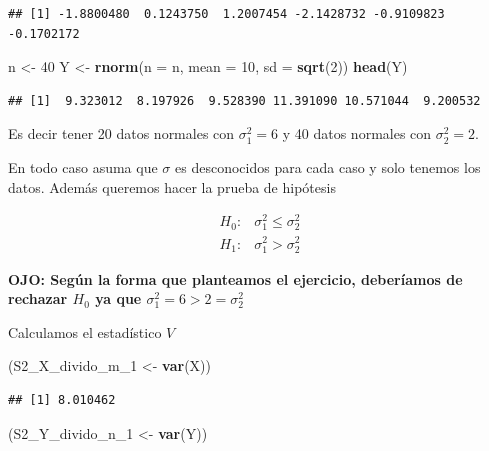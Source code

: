 \documentclass[
  12pt,
]{book}
\newenvironment{Shaded}{\begin{snugshade}}{\end{snugshade}}
\newcommand{\DataTypeTok}[1]{\textcolor[rgb]{0.13,0.29,0.53}{#1}}
\newcommand{\DecValTok}[1]{\textcolor[rgb]{0.00,0.00,0.81}{#1}}
\newcommand{\KeywordTok}[1]{\textcolor[rgb]{0.13,0.29,0.53}{\textbf{#1}}}
\newcommand{\NormalTok}[1]{#1}
\newcommand{\StringTok}[1]{\textcolor[rgb]{0.31,0.60,0.02}{#1}}
\begin{document}
\begin{verbatim}
## [1] -1.8800480  0.1243750  1.2007454 -2.1428732 -0.9109823 -0.1702172
\end{verbatim}

\begin{Shaded}
\begin{Highlighting}[]
\NormalTok{n \textless{}{-}}\StringTok{ }\DecValTok{40}
\NormalTok{Y \textless{}{-}}\StringTok{ }\KeywordTok{rnorm}\NormalTok{(}\DataTypeTok{n =}\NormalTok{ n, }\DataTypeTok{mean =} \DecValTok{10}\NormalTok{, }\DataTypeTok{sd =} \KeywordTok{sqrt}\NormalTok{(}\DecValTok{2}\NormalTok{))}
\KeywordTok{head}\NormalTok{(Y)}
\end{Highlighting}
\end{Shaded}

\begin{verbatim}
## [1]  9.323012  8.197926  9.528390 11.391090 10.571044  9.200532
\end{verbatim}

Es decir tener 20 datos normales con \(\sigma_1^2 = 6\) y 40 datos normales con \(\sigma_2^2 = 2\).

En todo caso asuma que \(\sigma\) es desconocidos para cada caso y solo tenemos
los datos. Además queremos hacer la prueba de hipótesis

\[
\begin{array}{ll}
H_{0}: & \sigma_{1}^{2} \leq \sigma_{2}^{2} \\
H_{1}: & \sigma_{1}^{2}>\sigma_{2}^{2}
\end{array}
\]

\textbf{OJO: Según la forma que planteamos el ejercicio, deberíamos de rechazar \(H_0\) ya que \(\sigma_1^2 = 6 > 2 = \sigma_2^2\)}

Calculamos el estadístico \(V\)

\begin{Shaded}
\begin{Highlighting}[]
\NormalTok{(S2\_X\_divido\_m\_}\DecValTok{1}\NormalTok{ \textless{}{-}}\StringTok{ }\KeywordTok{var}\NormalTok{(X))}
\end{Highlighting}
\end{Shaded}

\begin{verbatim}
## [1] 8.010462
\end{verbatim}

\begin{Shaded}
\begin{Highlighting}[]
\NormalTok{(S2\_Y\_divido\_n\_}\DecValTok{1}\NormalTok{ \textless{}{-}}\StringTok{ }\KeywordTok{var}\NormalTok{(Y))}
\end{Highlighting}
\end{Shaded}
\end{document}
